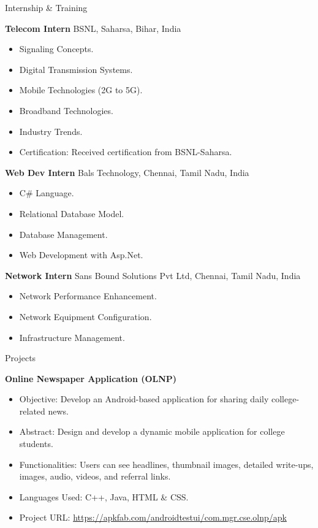 \documentclass{resume} %
\begin{document}
\begin{rSection}{Internship \& Training}

\textbf{Telecom Intern} \hfill {BSNL, Saharsa, Bihar, India}
\begin{itemize}
    \item Signaling Concepts.
    \item Digital Transmission Systems.
    \item Mobile Technologies (2G to 5G).
    \item Broadband Technologies.
    \item Industry Trends.
    \item Certification: Received certification from BSNL-Saharsa.
\end{itemize}

\textbf{Web Dev Intern} \hfill {Bals Technology, Chennai, Tamil Nadu, India}
\begin{itemize}
    \item C\# Language.
    \item Relational Database Model.
    \item Database Management.
    \item Web Development with Asp.Net.
\end{itemize}

\textbf{Network Intern} \hfill {Sans Bound Solutions Pvt Ltd, Chennai, Tamil Nadu, India}
\begin{itemize}
    \item Network Performance Enhancement.
    \item Network Equipment Configuration.
    \item Infrastructure Management.
\end{itemize}
\end{rSection}


\begin{rSection}{Projects}

\textbf{Online Newspaper Application (OLNP)}
\begin{itemize}
    \item Objective: Develop an Android-based application for sharing daily college-related news.
    \item Abstract: Design and develop a dynamic mobile application for college students.
    \item Functionalities: Users can see headlines, thumbnail images, detailed write-ups, images, audio, videos, and referral links.
    \item Languages Used: C++, Java, HTML \& CSS.
    \item Project URL: \href{https://apkfab.com/androidtestui/com.mgr.cse.olnp/apk}{https://apkfab.com/androidtestui/com.mgr.cse.olnp/apk}
\end{itemize}
\end{rSection}
\end{document}
